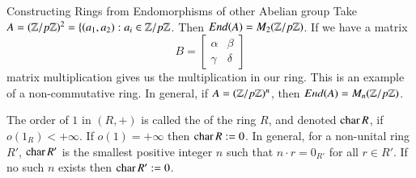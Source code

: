 \documentclass[12pt, a4paper, twoside, openright, titlepage]{book}
\begin{document}
\begin{eg}{Constructing Rings from Endomorphisms of other Abelian group}{}
        Take $A = (\mathbb Z/p\mathbb Z)^2 = \{(a_1,a_2): a_i \in \mathbb Z/p\mathbb Z$. Then $End(A) = M_2(\mathbb Z/p\mathbb Z)$. If we have a matrix \begin{equation}
                B = \begin{bmatrix} \alpha & \beta \\ \gamma & \delta \end{bmatrix}
        \end{equation}
        matrix multiplication gives us the multiplication in our ring. This is an example of a non-commutative ring. In general, if $A = (\mathbb Z/p\mathbb Z)^n$, then $End(A) = M_n(\mathbb Z/p\mathbb Z)$.
\end{eg}


\begin{defn}{}{}
    The order of $1$ in $(R,+)$ is called the  of the ring $R$, and denoted $\operatorname{char} R$, if $o(1_R) < +\infty$. If $o(1) = +\infty$ then $\operatorname{char} R := 0$. In general, for a non-unital ring $R'$, $\operatorname{char} R'$ is the smallest positive integer $n$ such that $n\cdot r = 0_{R'}$ for all $r \in R'$. If no such $n$ exists then $\operatorname{char} R' := 0$. 
\end{defn}
\end{document}
